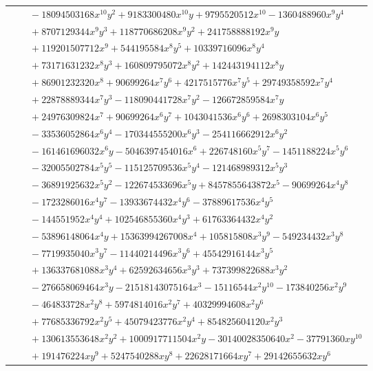 \documentclass[11pt]{article}
\begin{document}
\begin{longtable}{@{}ll@{}}
 & $\quad -18094503168x^{10}y^{2}+9183300480x^{10}y+9795520512x^{10}-1360488960x^{9}y^{4}$\\
 & $\quad +8707129344x^{9}y^{3}+118770686208x^{9}y^{2}+241758888192x^{9}y$\\
 & $\quad +119201507712x^{9}+544195584x^{8}y^{5}+10339716096x^{8}y^{4}$\\
 & $\quad +73171631232x^{8}y^{3}+160809795072x^{8}y^{2}+142443194112x^{8}y$\\
 & $\quad +86901232320x^{8}+90699264x^{7}y^{6}+4217515776x^{7}y^{5}+29749358592x^{7}y^{4}$\\
 & $\quad +22878889344x^{7}y^{3}-118090441728x^{7}y^{2}-126672859584x^{7}y$\\
 & $\quad +24976309824x^{7}+90699264x^{6}y^{7}+1043041536x^{6}y^{6}+2698303104x^{6}y^{5}$\\
 & $\quad -33536052864x^{6}y^{4}-170344555200x^{6}y^{3}-254116662912x^{6}y^{2}$\\
 & $\quad -161461696032x^{6}y-5046397454016x^{6}+226748160x^{5}y^{7}-1451188224x^{5}y^{6}$\\
 & $\quad -32005502784x^{5}y^{5}-115125709536x^{5}y^{4}-121468989312x^{5}y^{3}$\\
 & $\quad -36891925632x^{5}y^{2}-122674533696x^{5}y+8457855643872x^{5}-90699264x^{4}y^{8}$\\
 & $\quad -1723286016x^{4}y^{7}-13933674432x^{4}y^{6}-37889617536x^{4}y^{5}$\\
 & $\quad -144551952x^{4}y^{4}+102546855360x^{4}y^{3}+61763364432x^{4}y^{2}$\\
 & $\quad -53896148064x^{4}y+15363994267008x^{4}+105815808x^{3}y^{9}-549234432x^{3}y^{8}$\\
 & $\quad -7719935040x^{3}y^{7}-11440214496x^{3}y^{6}+45542916144x^{3}y^{5}$\\
 & $\quad +136337681088x^{3}y^{4}+62592634656x^{3}y^{3}+737399822688x^{3}y^{2}$\\
 & $\quad -276658069464x^{3}y-21518143075164x^{3}-15116544x^{2}y^{10}-173840256x^{2}y^{9}$\\
 & $\quad -464833728x^{2}y^{8}+5974814016x^{2}y^{7}+40329994608x^{2}y^{6}$\\
 & $\quad +77685336792x^{2}y^{5}+45079423776x^{2}y^{4}+854825604120x^{2}y^{3}$\\
 & $\quad +130613553648x^{2}y^{2}+1000917711504x^{2}y-30140028350640x^{2}-37791360xy^{10}$\\
 & $\quad +191476224xy^{9}+5247540288xy^{8}+22628171664xy^{7}+29142655632xy^{6}$\\

\end{longtable}
\end{document}
